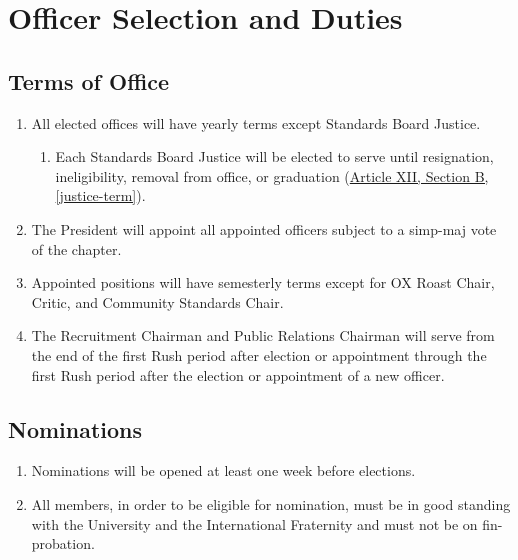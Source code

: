 \chapter{Officer Selection and Duties}

\section{Terms of Office}
	\begin{enumerate}
		\item All elected offices will have yearly terms except Standards Board Justice.
			\begin{enumerate}

				\item Each Standards Board Justice will be elected to serve until resignation, ineligibility, removal from office, or graduation (\hyperref[justice-term]{Article XII, Section B, \autoref*{justice-term}}).
			\end{enumerate}
		\item The President will appoint all appointed officers subject to a \gls{simp-maj} vote of the chapter. \label{appointed-approval}
			
		\item Appointed positions will have semesterly terms except for OX Roast Chair, Critic, and Community Standards Chair.
		
		\item The Recruitment Chairman and Public Relations Chairman will serve from the end of the first Rush period after election or appointment through the first Rush period after the election or appointment of a new officer.
	\end{enumerate}

\section{Nominations}
	\begin{enumerate}
		\item Nominations will be opened at least one week before elections.
		\item All members, in order to be eligible for nomination, must be in good standing with the University and the International Fraternity and must not be on \gls{fin-probation}.
	\end{enumerate}


